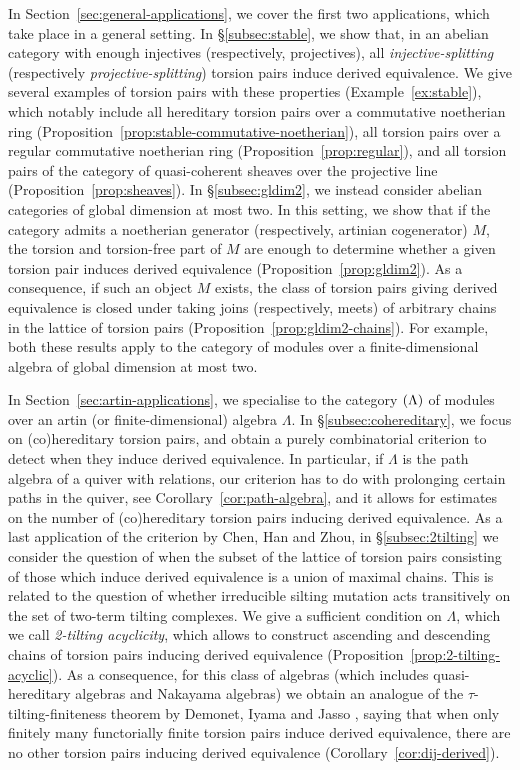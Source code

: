 \documentclass[a4paper,11pt]{amsart}
\theoremstyle{plain}
\theoremstyle{definition}
\let\mod\relax
\DeclareMathOperator{\mod}{\mathsf{mod}}
\begin{document}
In Section~\ref{sec:general-applications}, we cover the first two applications, which take place in a general
setting. In \S\ref{subsec:stable}, we show that, in an abelian category with
enough injectives (respectively, projectives), all \emph{injective-splitting}
(respectively \emph{projective-splitting}) torsion pairs
induce derived equivalence. We give several examples of torsion pairs with
these properties (Example~\ref{ex:stable}), which
notably include all hereditary torsion pairs over a commutative noetherian ring
(Proposition~\ref{prop:stable-commutative-noetherian}), all torsion pairs over a
regular commutative noetherian ring (Proposition~\ref{prop:regular}), and all
torsion pairs of the category of quasi-coherent sheaves over the
projective line (Proposition~\ref{prop:sheaves}). In \S\ref{subsec:gldim2}, we
instead consider abelian categories of global dimension at most two. In this
setting, we show that if the category admits a noetherian generator
(respectively, artinian cogenerator) $M$, the torsion and torsion-free part of
$M$ are enough to determine whether a given torsion pair induces derived
equivalence (Proposition~\ref{prop:gldim2}). As a consequence, if such an object
$M$ exists, the class of torsion pairs giving derived equivalence is closed
under taking joins (respectively, meets) of arbitrary chains in the lattice of
torsion pairs (Proposition~\ref{prop:gldim2-chains}). For example, both these
results apply to the category of modules over a finite-dimensional algebra of
global dimension at most two.

In Section~\ref{sec:artin-applications}, we specialise to the category
$\mod(\Lambda)$ of modules over an artin (or finite-dimensional) algebra
$\Lambda$. In \S\ref{subsec:cohereditary}, we focus on (co)hereditary
torsion pairs, and obtain a purely combinatorial criterion to detect when they
induce derived equivalence. In particular, if $\Lambda$ is the path algebra of a
quiver with relations, our criterion has to do with prolonging certain paths in the
quiver, see Corollary~\ref{cor:path-algebra}, and it allows for estimates on the
number of (co)hereditary torsion pairs inducing derived equivalence.
As a last application of the criterion by Chen, Han and Zhou, in
\S\ref{subsec:2tilting} we consider the question of when the subset of the
lattice of torsion pairs consisting of those which induce derived equivalence is
a union of maximal chains. This is related to the question of whether irreducible
silting mutation acts transitively on the set of two-term tilting complexes. We
give a sufficient condition on $\Lambda$, which we call \emph{2-tilting
acyclicity}, which allows to construct ascending and
descending chains of torsion pairs inducing derived equivalence
(Proposition~\ref{prop:2-tilting-acyclic}). As a consequence, for this class of algebras
(which includes quasi-hereditary algebras and Nakayama algebras)
we obtain an analogue of the $\tau$-tilting-finiteness theorem by Demonet, Iyama
and Jasso \cite{demo-iyam-jass-19}, saying that when only finitely many
functorially finite torsion pairs induce derived equivalence, there are no other
torsion pairs inducing derived equivalence (Corollary~\ref{cor:dij-derived}).
\end{document}
